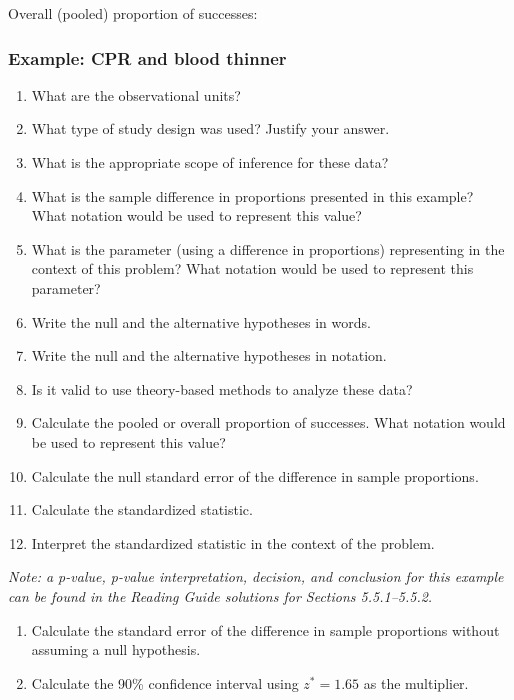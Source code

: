 \documentclass[
]{report}
\newcommand{\rgs}{\vspace{12pt}} %
\begin{document}
Overall (pooled) proportion of successes:
\rgs

\hypertarget{example-cpr-and-blood-thinner-1}{%
\subsubsection*{Example: CPR and blood thinner}\label{example-cpr-and-blood-thinner-1}}

\begin{enumerate}
\def\labelenumi{\arabic{enumi}.}
\item
  What are the observational units?
  \rgs
\item
  What type of study design was used? Justify your answer.
  \rgs
\item
  What is the appropriate scope of inference for these data?
  \rgs
\item
  What is the sample difference in proportions presented in this example? What notation would be used to represent this value?
  \rgs
\item
  What is the parameter (using a difference in proportions) representing in the context of this problem? What notation would be used to represent this parameter?
  \rgs
\item
  Write the null and the alternative hypotheses in words.
  \rgs
  \rgs
\item
  Write the null and the alternative hypotheses in notation.
  \rgs
\item
  Is it valid to use theory-based methods to analyze these data?
  \rgs
  \rgs
\item
  Calculate the pooled or overall proportion of successes. What notation would be used to represent this value?
  \rgs
  \rgs
\item
  Calculate the null standard error of the difference in sample proportions.
  \rgs
  \rgs
\item
  Calculate the standardized statistic.
  \rgs
  \rgs
\item
  Interpret the standardized statistic in the context of the problem.
  \rgs
  \rgs
\end{enumerate}

\emph{Note: a p-value, p-value interpretation, decision, and conclusion for this example can be found in the Reading Guide solutions for Sections 5.5.1--5.5.2.}

\begin{enumerate}
\def\labelenumi{\arabic{enumi}.}
\setcounter{enumi}{12}
\item
  Calculate the standard error of the difference in sample proportions without assuming a null hypothesis.
  \rgs
  \rgs
\item
  Calculate the 90\% confidence interval using \(z^*=1.65\) as the multiplier.
  \rgs
  \rgs
\end{enumerate}
\end{document}
